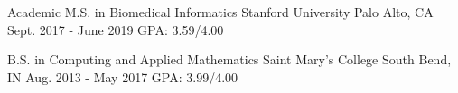 
\vspace{11pt}

\begin{cventries}

  \cventry
    {Academic M.S. in Biomedical Informatics}
    {Stanford University}
    {Palo Alto, CA}
    {Sept. 2017 - June 2019}
    {GPA: 3.59/4.00}
    
  \cventry
    {B.S. in Computing and Applied Mathematics}
    {Saint Mary's College}
    {South Bend, IN}
    {Aug. 2013 - May 2017}
    {GPA: 3.99/4.00}
    
\end{cventries}

\vspace{6pt}